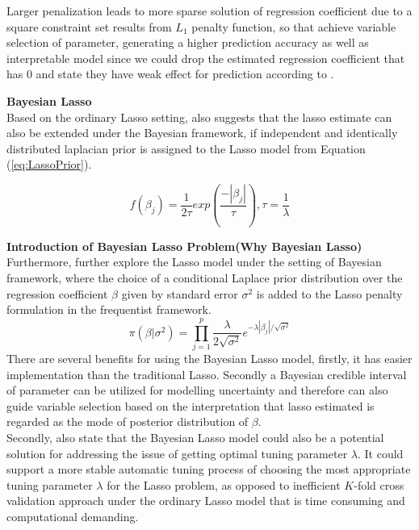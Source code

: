  Larger penalization leads to more sparse solution of regression coefficient due to a square constraint set results from $L_1$ penalty function, so that achieve variable selection of parameter, generating a higher prediction accuracy as well as interpretable model since we could drop the estimated regression coefficient that has 0 and state they have weak effect for prediction according to \cite{tibshirani_1996}.
 
\textbf{Bayesian Lasso}\\
Based on the ordinary Lasso setting, \cite{tibshirani_1996} also suggests that the lasso estimate can also be extended under the Bayesian framework, if independent and identically distributed laplacian prior is assigned to the Lasso model from Equation (\ref{eq:LassoPrior}).

\begin{equation}
	\label{eq:LassoPrior}
	f(\beta_j) = \frac{1}{2\tau} exp(\frac{-|\beta_j|}{\tau}), \tau = \frac{1}{\lambda}
\end{equation}


\textbf{Introduction of Bayesian Lasso Problem(Why Bayesian Lasso)}
Furthermore, \cite{park_casella_2008} further explore the Lasso model under the setting of Bayesian framework, where the choice of a conditional Laplace prior distribution over the regression coefficient $\beta$ given by standard error $\sigma^2$ is added to the Lasso penalty formulation in the frequentist framework. 
\begin{equation}
	\label{eq:lassoprior}
	\pi(\beta |\sigma^2) = \prod_{j=1}^p \frac{\lambda}{2\sqrt{\sigma^2}} e^{-\lambda|\beta_j|/\sqrt{\sigma^2}}
\end{equation}
There are several benefits for using the Bayesian Lasso model, firstly, it has easier implementation than the traditional Lasso. Secondly a Bayesian credible interval of parameter can be utilized for modelling uncertainty and therefore can also guide variable selection based on the interpretation that lasso estimated is regarded as the mode of posterior distribution of $\beta$. \\












Secondly, \cite{park_casella_2008} also state that the Bayesian Lasso model could also be a potential solution for addressing the issue of getting optimal tuning parameter $\lambda$. It could support a more stable automatic tuning process of choosing the most appropriate tuning parameter $\lambda$ for the Lasso problem, as opposed to inefficient $K$-fold cross validation approach under the ordinary Lasso model that is time consuming and computational demanding.

